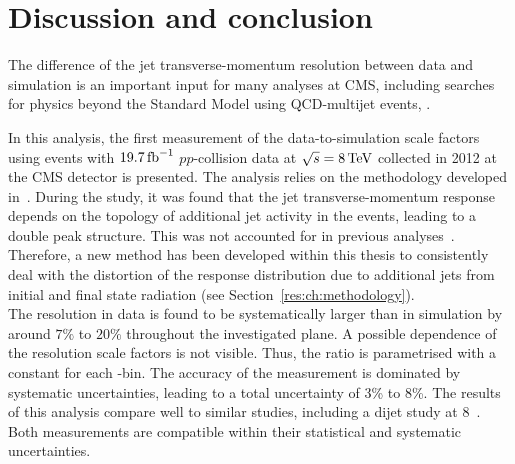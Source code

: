 \chapter{Discussion and conclusion}
The difference of the jet transverse-momentum resolution between data and simulation is an important input for many analyses at CMS, including searches for physics beyond the Standard Model using QCD-multijet events, \eg\cite{bib:CMS:RA2_8TeV,bib:CMS:MT2_8TeV,bib:CMS:AlphaT_8TeV}.

In this analysis, the first measurement of the data-to-simulation scale factors \rhores %
using \GAMJET events with $19.7\,\text{fb}^{-1}$ $pp$-collision data at $\sqrt{s}=8 \,\text{Te}\kern-0.06667em\text{V}$ collected in 2012 at the CMS detector is presented.
The analysis relies on the methodology developed in~\cite{bib:CMS:JERCPaper_2011,CMS:PAS:JETResolution_7TeV}.
During the study, it was found that the jet transverse-momentum response depends on the topology of additional jet activity in the events, leading to a double peak structure.
This was not accounted for in previous analyses~\cite{bib:CMS:JERCPaper_2011,CMS:PAS:JETResolution_7TeV}.
Therefore, a new method has been developed within this thesis to consistently deal with the distortion of the response distribution due to additional jets from initial and final state radiation (see Section~\ref{res:ch:methodology}).\\

The resolution in data is found to be systematically larger than in simulation by around $7\%$ to $20\%$ throughout the investigated \etajet plane. 
A possible \ptjet dependence of the resolution scale factors \rhores is not visible. 
Thus, the ratio is parametrised with a constant for each \etajet-bin.
The accuracy of the measurement is dominated by systematic uncertainties, leading to a total uncertainty of 3\% to 8\%.
The results of this analysis compare well to similar studies, including a dijet study at 8\tev ~\cite{bib:CMS:JME_PAS,bib:Kristin_Thesis}.
Both measurements are compatible within their statistical and systematic uncertainties.\\

